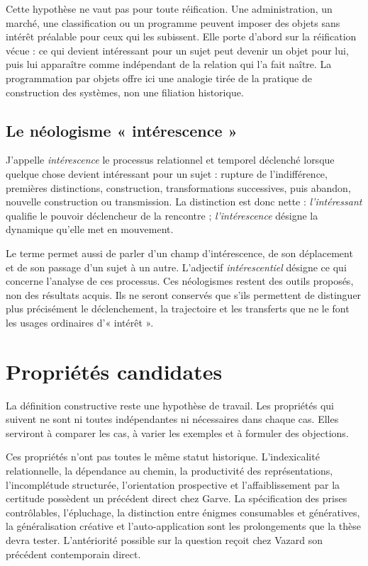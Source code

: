 \documentclass[11pt,a4paper]{article}
\begin{document}
Cette hypothèse ne vaut pas pour toute réification. Une administration, un
marché, une classification ou un programme peuvent imposer des objets sans
intérêt préalable pour ceux qui les subissent. Elle porte d'abord sur la
réification vécue : ce qui devient intéressant pour un sujet peut devenir un
objet pour lui, puis lui apparaître comme indépendant de la relation qui l'a
fait naître. La programmation par objets offre ici une analogie tirée de la
pratique de construction des systèmes, non une filiation historique.

\subsection{Le néologisme « intérescence »}

J'appelle \emph{intérescence} le processus relationnel et temporel déclenché
lorsque quelque chose devient intéressant pour un sujet : rupture de
l'indifférence, premières distinctions, construction, transformations
successives, puis abandon, nouvelle construction ou transmission. La distinction est donc
nette : \emph{l'intéressant} qualifie le pouvoir déclencheur de la rencontre ;
\emph{l'intérescence} désigne la dynamique qu'elle met en mouvement.

Le terme permet aussi de parler d'un champ d'intérescence, de son déplacement
et de son passage d'un sujet à un autre. L'adjectif \emph{intérescentiel} désigne
ce qui concerne l'analyse de ces processus. Ces néologismes restent des outils
proposés, non des résultats acquis. Ils ne seront conservés que s'ils permettent
de distinguer plus précisément le déclenchement, la trajectoire et les transferts
que ne le font les usages ordinaires d'« intérêt ».

\section{Propriétés candidates}

La définition constructive reste une hypothèse de travail. Les propriétés qui
suivent ne sont ni toutes indépendantes ni nécessaires dans chaque cas. Elles
serviront à comparer les cas, à varier les exemples et à formuler des objections.

Ces propriétés n'ont pas toutes le même statut historique. L'indexicalité
relationnelle, la dépendance au chemin, la productivité des représentations,
l'incomplétude structurée, l'orientation prospective et l'affaiblissement par
la certitude possèdent un précédent direct chez Garve. La spécification des
prises contrôlables, l'épluchage, la distinction entre énigmes consumables et
génératives, la généralisation créative et l'auto-application sont les
prolongements que la thèse devra tester. L'antériorité possible sur la
question reçoit chez Vazard son précédent contemporain direct.
\end{document}
